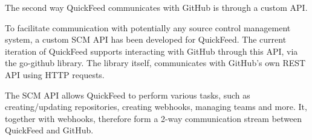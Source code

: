 The second way QuickFeed communicates with GitHub is through a custom API.

To facilitate communication with potentially any source control management system, a custom SCM API has been developed for QuickFeed.
The current iteration of QuickFeed supports interacting with GitHub through this API, via the go-github library. %
The library itself, communicates with GitHub's own REST API using HTTP requests.

The SCM API allows QuickFeed to perform various tasks, such as creating/updating repositories, creating webhooks, managing teams and more.
It, together with webhooks, therefore form a 2-way communication stream between QuickFeed and GitHub.